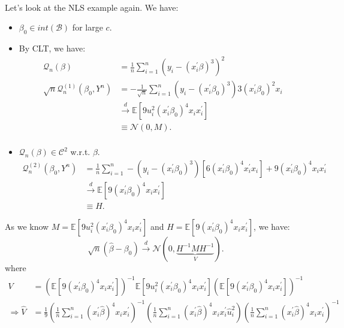 \begin{eg}
    \
    
    Let's look at the NLS example again. We have:
    \begin{itemize}
        \item $\beta_0 \in int(\mathscr{B})$ for large $c$.
        \item By CLT, we have:
        \begin{align*}
            \mathcal{Q}_n(\beta) &= \frac{1}{n} \sum_{i=1}^{n} \left(y_i - (x_i^{\prime} \beta)^3\right)^2 \\
            \sqrt{n} \mathcal{Q}_n^{(1)}(\beta_0, Y^n) &= -\frac{1}{\sqrt{n} } \sum_{i=1}^{n} \left(y_i - (x_i^{\prime} \beta_0)^3\right) 3\left(x_i^{\prime} \beta_0\right)^2 x_i \\
            & \overset{d}{\rightarrow} \mathbb{E}\left[9u_i^2(x_i^{\prime} \beta_0)^4 x_i x_i^{\prime} \right] \\
            & \equiv \mathcal{N}(0, M).\\
        \end{align*}
        \item $\mathcal{Q}_n(\beta) \in \mathcal{C}^2$ w.r.t. $\beta$.
        \begin{align*}
            \mathcal{Q}_n^{(2)}(\beta_0, Y^n) &= \frac{1}{n} \sum_{i=1}^{n} -\left(y_i - (x_i^{\prime} \beta_0)^3\right) \left[6(x_i^{\prime} \beta_0)^4 x_i^{\prime} x_i\right] + 9\left(x_i^{\prime} \beta_0\right)^4 x_i x_i^{\prime}  \\
            & \overset{d}{\rightarrow} \mathbb{E}\left[9(x_i^{\prime} \beta_0)^4 x_i x_i^{\prime} \right] \\
            & \equiv H.       
        \end{align*}
    \end{itemize}
    As we know $M = \mathbb{E}\left[9u_i^2(x_i^{\prime} \beta_0)^4 x_i x_i^{\prime} \right]$ and $H = \mathbb{E}\left[9(x_i^{\prime} \beta_0)^4 x_i x_i^{\prime} \right]$,
    we have:
    \[
    \sqrt{n}(\hat{\beta} - \beta_0) \overset{d}{\rightarrow} \mathcal{N}(0, \underset{V}{\underbrace{H^{-1} M H^{-1}}}).
    \]
    where
    \begin{align*}
        V &= \left(\mathbb{E}\left[9(x_i^{\prime} \beta_0)^4 x_i x_i^{\prime} \right]\right)^{-1} \mathbb{E}\left[9u_i^2(x_i^{\prime} \beta_0)^4 x_i x_i^{\prime} \right] \left(\mathbb{E}\left[9(x_i^{\prime} \beta_0)^4 x_i x_i^{\prime} \right]\right)^{-1} \\
        \Rightarrow \hat{V} &= \frac{1}{9}\left(\frac{1}{n} \sum_{i=1}^{n} (x_i^{\prime} \hat{\beta})^4 x_i x_i^{\prime} \right)^{-1} \left(\frac{1}{n} \sum_{i=1}^{n} (x_i^{\prime} \hat{\beta})^4 x_i x_i^{\prime} \hat{u}_i^2 \right) \left(\frac{1}{n} \sum_{i=1}^{n} (x_i^{\prime} \hat{\beta})^4 x_i x_i^{\prime} \right)^{-1} \\

\end{align*}
\end{eg}
